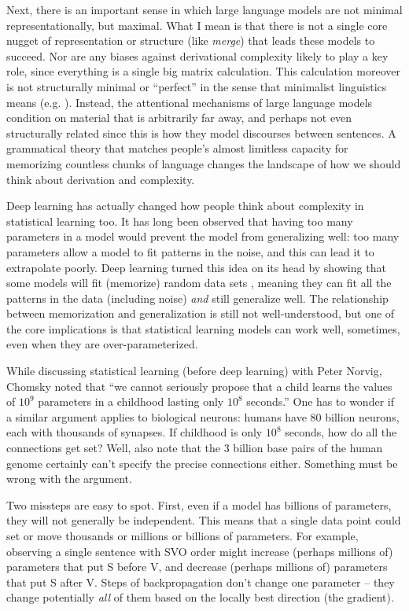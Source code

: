 \documentclass[output=paper,colorlinks,citecolor=brown]{langscibook}
\begin{document}
Next, there is an important sense in which large language models are not minimal representationally, but maximal. What I mean is that there is not a single core nugget of representation or structure (like \textit{merge}) that leads these models to succeed. Nor are any biases against derivational complexity likely to play a key role, since everything is a single big matrix calculation. This calculation moreover is not structurally minimal or ``perfect'' in the sense that minimalist linguistics means (e.g. \citealt{lasnik2002minimalist}). Instead, the attentional mechanisms of large language models condition on material that is arbitrarily far away, and perhaps not even structurally related since this is how they model discourses between sentences. A grammatical theory that matches people's almost limitless capacity for memorizing countless chunks of language changes the landscape of how we should think about derivation and complexity. 

Deep learning has actually changed how people think about complexity in statistical learning too. It has long been observed that having too many parameters in a model would prevent the model from generalizing well: too many parameters allow a model to fit patterns in the noise, and this can lead it to extrapolate poorly. Deep learning turned this idea on its head by showing that some models will fit (memorize) random data sets \citep{zhang2021understanding}, meaning they can fit all the patterns in the data (including noise) \textit{and} still generalize well. The relationship between memorization and generalization is still not well-understood, but one of the core implications is that statistical learning models can work well, sometimes, even when they are over-parameterized. 

While discussing statistical learning (before deep learning) with Peter Norvig, Chomsky noted that ``we cannot seriously propose that a child learns the values of $10^9$ parameters in a childhood lasting only $10^8$ seconds.'' One has to wonder if a similar argument applies to biological neurons: humans have $80$ billion neurons, each with thousands of synapses. If childhood is only $10^8$ seconds, how do all the connections get set? Well, also note that the $3$ billion base pairs of the human genome certainly can't specify the precise connections either. Something must be wrong with the argument. 

Two missteps are easy to spot. First, even if a model has billions of parameters, they will not generally be independent. This means that a single data point could set or move thousands or millions or billions of parameters. For example, observing a single sentence with SVO order might increase (perhaps millions of) parameters that put S before V, and decrease (perhaps millions of) parameters that put S after V. Steps of backpropagation don't change one parameter -- they change potentially \textit{all} of them based on the locally best direction (the gradient). 
\end{document}
